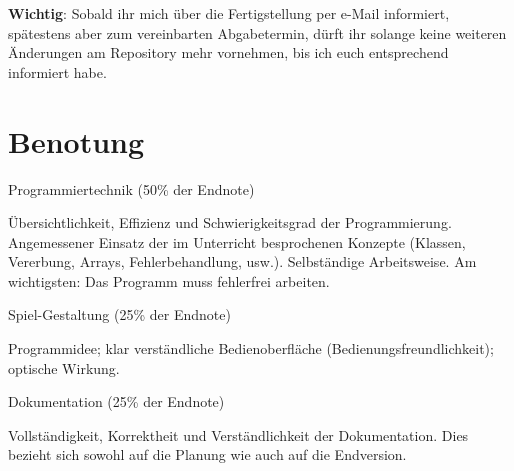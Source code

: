 \textbf{Wichtig}: Sobald ihr mich über die Fertigstellung per e-Mail informiert,
spätestens aber zum vereinbarten Abgabetermin, dürft ihr solange keine weiteren
Änderungen am Repository mehr vornehmen, bis ich euch entsprechend informiert
habe.


\section{Benotung}

\begin{compactenum}[a)]
\item  Programmiertechnik (50\% der Endnote)

Übersichtlichkeit, Effizienz und Schwierigkeitsgrad der Programmierung.
Angemessener Einsatz der im Unterricht besprochenen Konzepte (Klassen,
Vererbung, Arrays, Fehlerbehandlung, usw.). Selbständige Arbeitsweise.
Am wichtigsten: Das Programm muss fehlerfrei arbeiten.

\item Spiel-Gestaltung (25\% der Endnote)

Programmidee; klar verständliche Bedienoberfläche (Bedienungsfreundlichkeit);
optische Wirkung.

\item Dokumentation (25\% der Endnote)

Vollständigkeit, Korrektheit und Verständlichkeit der Dokumentation. Dies
bezieht sich sowohl auf die Planung wie auch auf die Endversion.
\end{compactenum}



